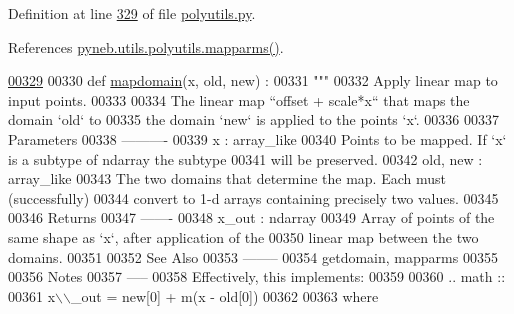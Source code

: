 Definition at line \hyperlink{polyutils_8py_source_l00329}{329} of file \hyperlink{polyutils_8py_source}{polyutils.\-py}.



References \hyperlink{polyutils_8py_source_l00282}{pyneb.\-utils.\-polyutils.\-mapparms()}.


\begin{DoxyCode}
\hypertarget{namespacepyneb_1_1utils_1_1polyutils_l00329}{}\hyperlink{namespacepyneb_1_1utils_1_1polyutils_ad7fe440bbe8d96e839de461f4db98cef}{00329} 
00330 \textcolor{keyword}{def }\hyperlink{namespacepyneb_1_1utils_1_1polyutils_ad7fe440bbe8d96e839de461f4db98cef}{mapdomain}(x, old, new) :
00331     \textcolor{stringliteral}{"""}
00332 \textcolor{stringliteral}{    Apply linear map to input points.}
00333 \textcolor{stringliteral}{}
00334 \textcolor{stringliteral}{    The linear map ``offset + scale*x`` that maps the domain `old` to}
00335 \textcolor{stringliteral}{    the domain `new` is applied to the points `x`.}
00336 \textcolor{stringliteral}{}
00337 \textcolor{stringliteral}{    Parameters}
00338 \textcolor{stringliteral}{    ----------}
00339 \textcolor{stringliteral}{    x : array\_like}
00340 \textcolor{stringliteral}{        Points to be mapped. If `x` is a subtype of ndarray the subtype}
00341 \textcolor{stringliteral}{        will be preserved.}
00342 \textcolor{stringliteral}{    old, new : array\_like}
00343 \textcolor{stringliteral}{        The two domains that determine the map.  Each must (successfully)}
00344 \textcolor{stringliteral}{        convert to 1-d arrays containing precisely two values.}
00345 \textcolor{stringliteral}{}
00346 \textcolor{stringliteral}{    Returns}
00347 \textcolor{stringliteral}{    -------}
00348 \textcolor{stringliteral}{    x\_out : ndarray}
00349 \textcolor{stringliteral}{        Array of points of the same shape as `x`, after application of the}
00350 \textcolor{stringliteral}{        linear map between the two domains.}
00351 \textcolor{stringliteral}{}
00352 \textcolor{stringliteral}{    See Also}
00353 \textcolor{stringliteral}{    --------}
00354 \textcolor{stringliteral}{    getdomain, mapparms}
00355 \textcolor{stringliteral}{}
00356 \textcolor{stringliteral}{    Notes}
00357 \textcolor{stringliteral}{    -----}
00358 \textcolor{stringliteral}{    Effectively, this implements:}
00359 \textcolor{stringliteral}{}
00360 \textcolor{stringliteral}{    .. math ::}
00361 \textcolor{stringliteral}{        x\(\backslash\)\(\backslash\)\_out = new[0] + m(x - old[0])}
00362 \textcolor{stringliteral}{}
00363 \textcolor{stringliteral}{    where}

\end{DoxyCode}
